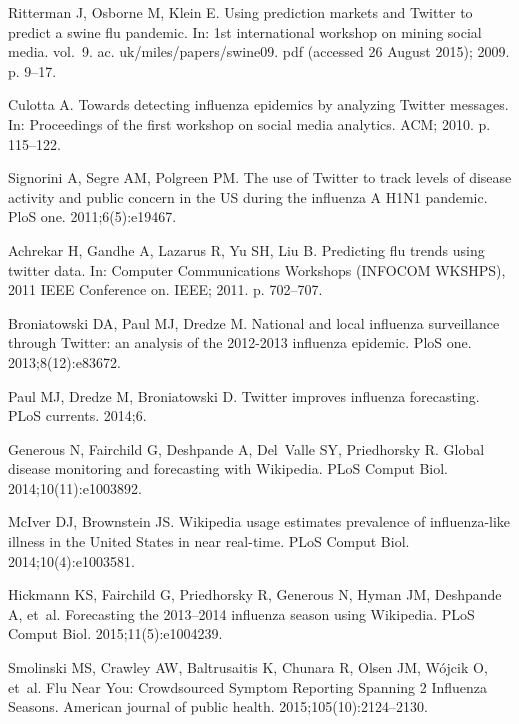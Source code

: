 \documentclass[10pt,letterpaper]{article}
\begin{document}
\begin{thebibliography}{10}
Ritterman J, Osborne M, Klein E.
\newblock Using prediction markets and Twitter to predict a swine flu pandemic.
\newblock In: 1st international workshop on mining social media. vol.~9. ac.
  uk/miles/papers/swine09. pdf (accessed 26 August 2015); 2009. p. 9--17.

Culotta A.
\newblock Towards detecting influenza epidemics by analyzing Twitter messages.
\newblock In: Proceedings of the first workshop on social media analytics. ACM;
  2010. p. 115--122.

Signorini A, Segre AM, Polgreen PM.
\newblock The use of Twitter to track levels of disease activity and public
  concern in the US during the influenza A H1N1 pandemic.
\newblock PloS one. 2011;6(5):e19467.

Achrekar H, Gandhe A, Lazarus R, Yu SH, Liu B.
\newblock Predicting flu trends using twitter data.
\newblock In: Computer Communications Workshops (INFOCOM WKSHPS), 2011 IEEE
  Conference on. IEEE; 2011. p. 702--707.

Broniatowski DA, Paul MJ, Dredze M.
\newblock National and local influenza surveillance through Twitter: an
  analysis of the 2012-2013 influenza epidemic.
\newblock PloS one. 2013;8(12):e83672.

Paul MJ, Dredze M, Broniatowski D.
\newblock Twitter improves influenza forecasting.
\newblock PLoS currents. 2014;6.

Generous N, Fairchild G, Deshpande A, Del~Valle SY, Priedhorsky R.
\newblock Global disease monitoring and forecasting with Wikipedia.
\newblock PLoS Comput Biol. 2014;10(11):e1003892.

McIver DJ, Brownstein JS.
\newblock Wikipedia usage estimates prevalence of influenza-like illness in the
  United States in near real-time.
\newblock PLoS Comput Biol. 2014;10(4):e1003581.

Hickmann KS, Fairchild G, Priedhorsky R, Generous N, Hyman JM, Deshpande A,
  et~al.
\newblock Forecasting the 2013--2014 influenza season using Wikipedia.
\newblock PLoS Comput Biol. 2015;11(5):e1004239.

Smolinski MS, Crawley AW, Baltrusaitis K, Chunara R, Olsen JM, W{\'o}jcik O,
  et~al.
\newblock Flu Near You: Crowdsourced Symptom Reporting Spanning 2 Influenza
  Seasons.
\newblock American journal of public health. 2015;105(10):2124--2130.


\end{thebibliography}
\end{document}
